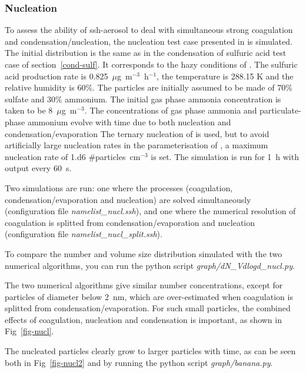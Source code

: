 \documentclass[a4paper,11pt]{article}
\begin{document}
\subsubsection{Nucleation}

To assess the ability of ssh-aerosol to deal with simultaneous strong coagulation and condensation/nucleation, the nucleation test case presented in \cite{sartelet2006development} is simulated. The initial distribution is the same as in the condensation of sulfuric acid test case of section~\ref{cond-sulf}. It corresponds to the hazy conditions of \cite{seigneur1986simulation}. The sulfuric
acid production rate is 0.825~$\mu$g~m$^{-3}$~h$^{-1}$,
the temperature is 288.15 K and the relative humidity is 60\%. The particles are initially assumed to be made of 70\% sulfate and 30\% ammonium. The initial gas phase ammonia concentration is taken to be 8~$\mu$g~m$^{-3}$. The concentrations of gas phase ammonia and particulate-phase ammonium evolve with time due to both nucleation and condensation/evaporation
The ternary nucleation of \cite{napari} is used, but to avoid artificially large nucleation rates in the parameterisation of \cite{napari}, a maximum nucleation rate of 1.d6 \#particles~cm$^{-3}$ is set.
The simulation is run for 1~h with output every 60~s.

Two simulations are run: one where the processes (coagulation,
condensation/evaporation and nucleation) are solved simultaneously
(configuration file {\it{namelist\_nucl.ssh}}), and one where the numerical
resolution of coagulation is splitted from condensation/evaporation and
nucleation (configuration file {\it{namelist\_nucl\_split.ssh}}). 


To compare the number and volume size distribution simulated with the two numerical algorithms, you can run the python script {\it{graph/dN\_Vdlogd\_nucl.py}}.

The two numerical algorithms give similar number concentrations, except for
particles of diameter below 2~nm, which are over-estimated when coagulation is
splitted from condensation/evaporation. For such small particles, the combined
effects of coagulation, nucleation and condensation is important, as shown in Fig~\ref{fig-nucl}.

The nucleated particles clearly grow to larger particles with time, as can be seen both in Fig~\ref{fig-nucl2} and by running the python script {\it{graph/banana.py}}.
\end{document}
